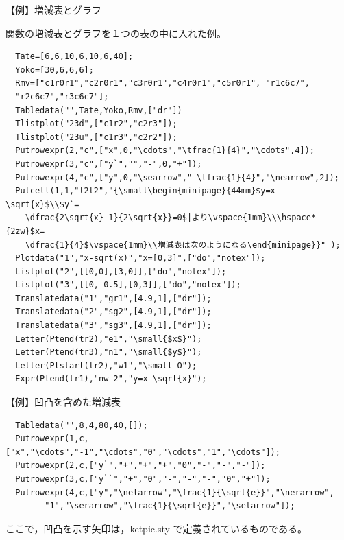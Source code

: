 \documentclass[papersize,a4paper,12pt,uplatex]{jsarticle}
\begin{document}
\begin{description}
\vspace{\baselineskip}
 \begin{center}\scalebox{0.9}{ } \end{center}


\vspace{\baselineskip}
【例】増減表とグラフ

  関数の増減表とグラフを１つの表の中に入れた例。
\begin{verbatim}
  Tate=[6,6,10,6,10,6,40];
  Yoko=[30,6,6,6];
  Rmv=["c1r0r1","c2r0r1","c3r0r1","c4r0r1","c5r0r1", "r1c6c7",
  "r2c6c7","r3c6c7"]; 
  Tabledata("",Tate,Yoko,Rmv,["dr"])
  Tlistplot("23d",["c1r2","c2r3"]);
  Tlistplot("23u",["c1r3","c2r2"]);
  Putrowexpr(2,"c",["x",0,"\cdots","\tfrac{1}{4}","\cdots",4]);
  Putrowexpr(3,"c",["y`","","-",0,"+"]);
  Putrowexpr(4,"c",["y",0,"\searrow","-\tfrac{1}{4}","\nearrow",2]);
  Putcell(1,1,"l2t2","{\small\begin{minipage}{44mm}$y=x-\sqrt{x}$\\$y`=
    \dfrac{2\sqrt{x}-1}{2\sqrt{x}}=0$|より\vspace{1mm}\\\hspace*{2zw}$x=
    \dfrac{1}{4}$\vspace{1mm}\\増減表は次のようになる\end{minipage}}" );
  Plotdata("1","x-sqrt(x)","x=[0,3]",["do","notex"]);
  Listplot("2",[[0,0],[3,0]],["do","notex"]);
  Listplot("3",[[0,-0.5],[0,3]],["do","notex"]);
  Translatedata("1","gr1",[4.9,1],["dr"]);
  Translatedata("2","sg2",[4.9,1],["dr"]);
  Translatedata("3","sg3",[4.9,1],["dr"]);
  Letter(Ptend(tr2),"e1","\small{$x$}");
  Letter(Ptend(tr3),"n1","\small{$y$}");
  Letter(Ptstart(tr2),"w1","\small O");
  Expr(Ptend(tr1),"nw-2","y=x-\sqrt{x}");
\end{verbatim}
\begin{center}  \end{center}
              
\vspace{\baselineskip}
  【例】凹凸を含めた増減表
\begin{verbatim}
  Tabledata("",8,4,80,40,[]);
  Putrowexpr(1,c,["x","\cdots","-1","\cdots","0","\cdots","1","\cdots"]);
  Putrowexpr(2,c,["y`","+","+","+","0","-","-","-"]);
  Putrowexpr(3,c,["y``","+","0","-","-","-","0","+"]);
  Putrowexpr(4,c,["y","\nelarrow","\frac{1}{\sqrt{e}}","\nerarrow",
        "1","\serarrow","\frac{1}{\sqrt{e}}","\selarrow"]);
\end{verbatim}
\begin{center}  \end{center}
ここで，凹凸を示す矢印は，ketpic.sty で定義されているものである。


\end{description}
\end{document}
